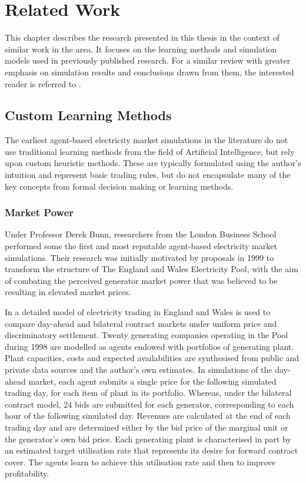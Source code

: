 \chapter{Related Work}
\label{ch:related_work}
This chapter describes the research presented in this thesis in the context of
similar work in the area.  It focuses on the learning methods and simulation
models used in previously published research.  For a similar review with greater emphasis on
simulation results and conclusions drawn from them, the interested reader is
referred to .

\section{Custom Learning Methods}
The earliest agent-based electricity market simulations in the literature do not
use traditional learning methods from the field of Artificial Intelligence, but
rely upon custom heuristic methods.  These are typically formulated using the
author's intuition and represent basic trading rules, but do not encapsulate
many of the key concepts from formal decision making or learning methods.

\subsection{Market Power}
Under Professor Derek Bunn, researchers from the London Business School
performed some the first and most reputable agent-based electricity market
simulations.  Their research was initially motivated by proposals in 1999 to
transform the structure of The England and Wales Electricity Pool, with the aim
of combating the perceived generator market power that was believed to be
resulting in elevated market prices.

In  a detailed model of electricity trading in England and
Wales is used to compare day-ahead and bilateral contract markets under uniform
price and discriminatory settlement.  Twenty generating companies operating in
the Pool during 1998 are modelled as agents endowed with portfolios of
generating plant.  Plant capacities, costs and expected availabilities are
synthesised from public and private data sources and the author's own estimates.
 In simulations of the day-ahead market, each agent submits a single price for
the following simulated trading day, for each item of plant in its portfolio.
Whereas, under the bilateral contract model, 24 bids are submitted for each
generator, corresponding to each hour of the following simulated day.  Revenues
are calculated at the end of each trading day and are determined either by the
bid price of the marginal unit or the generator's own bid price.  Each
generating plant is characterised in part by an estimated target utilisation
rate that represents its desire for forward contract cover.  The agents learn to
achieve this utilisation rate and then to improve profitability.

